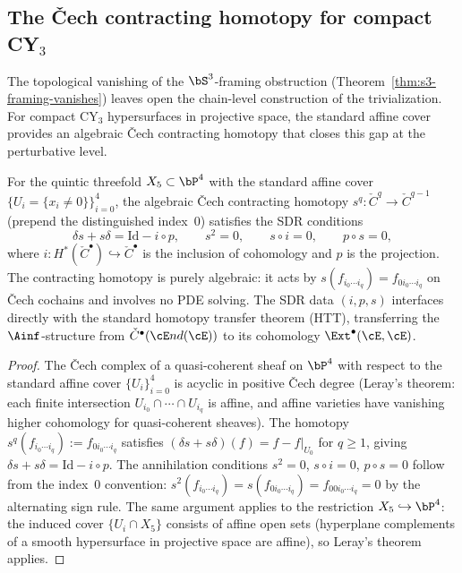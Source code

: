 \subsection{The \v{C}ech contracting homotopy for compact CY\texorpdfstring{$_3$}{-3}}
\label{subsec:cech-contracting-homotopy}

The topological vanishing of the $\bS^3$-framing obstruction
(Theorem~\ref{thm:s3-framing-vanishes}) leaves open the chain-level
construction of the trivialization. For compact CY$_3$ hypersurfaces
in projective space, the standard affine cover provides an algebraic
\v{C}ech contracting homotopy that closes this gap at the perturbative level.

\begin{theorem}
\label{thm:cech-contracting-homotopy}
For the quintic threefold $X_5 \subset \bP^4$ with the standard affine
cover $\{U_i = \{x_i \neq 0\}\}_{i=0}^4$, the algebraic \v{C}ech
contracting homotopy $s^q \colon \check{C}^q \to \check{C}^{q-1}$
\textup{(}prepend the distinguished index~$0$\textup{)} satisfies the
SDR conditions
\[
 \delta s + s \delta = \mathrm{Id} - i \circ p, \qquad
 s^2 = 0, \qquad
 s \circ i = 0, \qquad
 p \circ s = 0,
\]
where $i \colon H^*(\check{C}^\bullet) \hookrightarrow \check{C}^\bullet$
is the inclusion of cohomology and $p$ is the projection. The contracting
homotopy is purely algebraic: it acts by
$s(f_{i_0 \cdots i_q}) = f_{0 i_0 \cdots i_q}$ on \v{C}ech cochains and
involves no PDE solving. The SDR data $(i, p, s)$ interfaces directly
with the standard homotopy transfer theorem
\textup{(}HTT\textup{)},
transferring the $\Ainf$-structure from $\check{C}^\bullet(\cE nd(\cE))$
to its cohomology $\Ext^\bullet(\cE, \cE)$.
\end{theorem}

\begin{proof}
The \v{C}ech complex of a quasi-coherent sheaf on $\bP^4$ with respect
to the standard affine cover $\{U_i\}_{i=0}^4$ is acyclic in positive
\v{C}ech degree (Leray's theorem: each finite intersection
$U_{i_0} \cap \cdots \cap U_{i_q}$ is affine, and affine varieties
have vanishing higher cohomology for quasi-coherent sheaves).
The homotopy $s^q(f_{i_0 \cdots i_q}) := f_{0 i_0 \cdots i_q}$
satisfies $(\delta s + s \delta)(f) = f - f|_{U_0}$ for
$q \geq 1$, giving $\delta s + s \delta = \mathrm{Id} - i \circ p$.
The annihilation conditions $s^2 = 0$, $s \circ i = 0$,
$p \circ s = 0$ follow from the index~$0$ convention:
$s^2(f_{i_0 \cdots i_q}) = s(f_{0 i_0 \cdots i_q})
= f_{00 i_0 \cdots i_q} = 0$ by the alternating sign rule.
The same argument applies to the restriction $X_5 \hookrightarrow \bP^4$:
the induced cover $\{U_i \cap X_5\}$ consists of affine open sets
(hyperplane complements of a smooth hypersurface in projective space
are affine), so Leray's theorem applies.
\end{proof}

